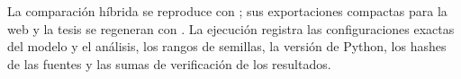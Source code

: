 La comparación híbrida se reproduce con ; sus exportaciones compactas para la web y la tesis se regeneran con . La ejecución \code{\HybridRunID} registra las configuraciones exactas del modelo y el análisis, los rangos de semillas, la versión de Python, los hashes de las fuentes y las sumas de verificación de los resultados.
